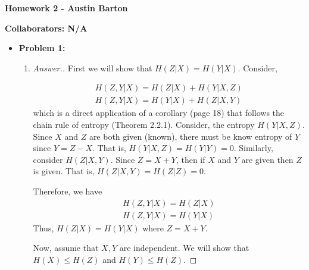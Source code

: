 \documentclass[10pt,twoside]{article}
\begin{document}
\begin{center}
\huge{\bf{Homework 2} - Austin Barton}
\end{center}

\medskip

\noindent \large{\textbf{Collaborators: N/A}}

\medskip

\begin{itemize}
    \item\textbf{Problem 1:} \newline
    \noindent\makebox[\linewidth]{\rule{18cm}{0.4pt}}
    \begin{enumerate}
        \item \begin{proof}[Answer.] 
    First we will show that $H(Z|X) = H(Y|X)$. Consider,

    \begin{gather*}
        H(Z,Y|X) = H(Z|X) + H(Y|X,Z) \\
        H(Z,Y|X) = H(Y|X) + H(Z|X, Y)
    \end{gather*}
    which is a direct application of a corollary (page 18) that follows the chain rule of entropy (Theorem 2.2.1). Consider, the entropy $H(Y|X,Z)$. Since $X$ and $Z$ are both given (known), there must be know entropy of $Y$ since $Y = Z - X$. That is, $H(Y|X,Z) = H(Y|Y) = 0$. Similarly, consider $H(Z|X,Y)$. Since $Z = X+Y$, then if $X$ and $Y$ are given then $Z$ is given. That is, $H(Z|X,Y) = H(Z|Z) = 0$.

    Therefore, we have
    \begin{gather*}
        H(Z,Y|X) = H(Z|X) \\
        H(Z,Y|X) = H(Y|X) 
    \end{gather*}
    Thus, $H(Z|X) = H(Y|X)$ where $Z = X+Y$.

    Now, assume that $X,Y$ are independent. We will show that $H(X) \leq H(Z)$ and $H(Y)\leq H(Z)$.


\end{proof}
\end{enumerate}
\end{itemize}
\end{document}
